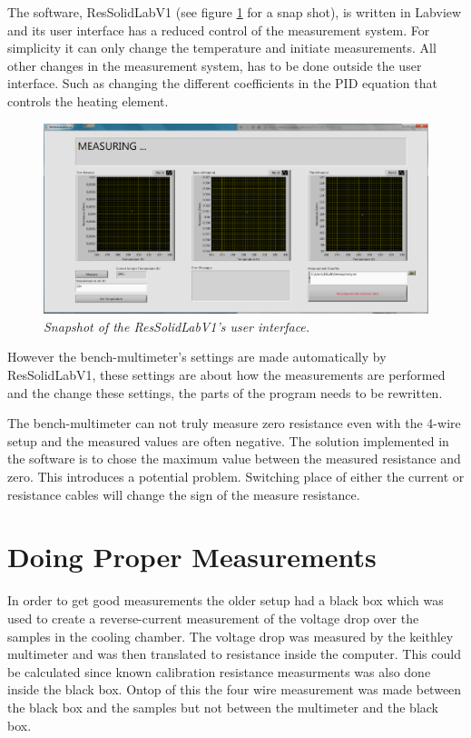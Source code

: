 \documentclass[a4paper,12pt]{article}
\begin{document}
The software, ResSolidLabV1 (see figure \ref{fig:UI} for a snap shot), is written in Labview and its user interface has a reduced control of the measurement system. For simplicity it can only change the temperature and initiate measurements. All other changes in the measurement system, has to be done outside the user interface. Such as changing the different coefficients in the PID equation that controls the heating element. 


\begin{figure}[H]
\center
\includegraphics[width=1\textwidth]{ResSolidLabV1UI}
\caption{\emph{Snapshot of the ResSolidLabV1's user interface.}}
\label{fig:UI}
\end{figure}

However the bench-multimeter's settings are made automatically by ResSolidLabV1, these settings are about how the measurements are performed and the change these settings, the parts of the program needs to be rewritten.

The  bench-multimeter can not truly measure zero resistance even with the 4-wire setup and the measured values are often negative. The solution implemented in the software is to chose the maximum value between the measured resistance and zero. This introduces a potential problem. Switching place of either the current or resistance cables will change the sign of the measure resistance.

\section{Doing Proper Measurements}
In order to get good measurements the older setup had a black box which was used to create a reverse-current measurement of the voltage drop over the samples in the cooling chamber. The voltage drop was measured by the keithley multimeter and was then translated to resistance inside the computer. This could be calculated since known calibration resistance measurments was also done inside the black box. Ontop of this the four wire measurement was made between the black box and the samples but not between the multimeter and the black box.
\end{document}
